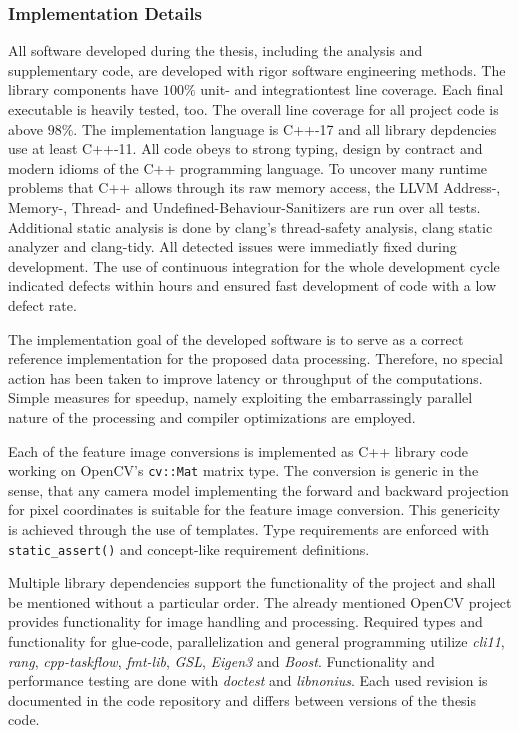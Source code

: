 \subsubsection{Implementation Details}

All software developed during the thesis, including the analysis and supplementary code, are developed with rigor software engineering methods.
The library components have $100\%$ unit- and integrationtest line coverage.
Each final executable is heavily tested, too.
The overall line coverage for all project code is above $98\%$.
The implementation language is C++-17\cite{c++17} and all library depdencies use at least C++-11\cite{c++11}.
All code obeys to strong typing, design by contract\cite{meyer_ieee1992} and modern idioms of the C++ programming language\cite{stroustrup_cpppl2013}.
To uncover many runtime problems that C++ allows through its raw memory access, the LLVM Address-, Memory-, Thread- and Undefined-Behaviour-Sanitizers\cite{google_sanitizers} are run over all tests.
Additional static analysis is done by clang's thread-safety analysis\cite{clang_thread_safety}, clang static analyzer\cite{clang_static_analyzer} and clang-tidy\cite{babati2017static}.
All detected issues were immediatly fixed during development.
The use of continuous integration\cite{fowler_ci2000} for the whole development cycle indicated defects within hours and ensured fast development of code with a low defect rate.

The implementation goal of the developed software is to serve as a correct reference implementation for the proposed data processing.
Therefore, no special action has been taken to improve latency or throughput of the computations.
Simple measures for speedup, namely exploiting the embarrassingly parallel nature of the processing and compiler optimizations are employed.

Each of the feature image conversions is implemented as C++ library code working on OpenCV's\cite{opencv_library} \lstinline[basicstyle=\ttfamily]|cv::Mat| matrix type.
The conversion is generic in the sense, that any camera model implementing the forward and backward projection for pixel coordinates is suitable for the feature image conversion.
This genericity is achieved through the use of templates.
Type requirements are enforced with \lstinline[basicstyle=\ttfamily]|static_assert()| and concept-like\cite{c++concepts} requirement definitions.

Multiple library dependencies support the functionality of the project and shall be mentioned without a particular order.
The already mentioned OpenCV\cite{opencv_library} project provides functionality for image handling and processing. 
Required types and functionality for glue-code, parallelization and general programming utilize \emph{cli11}\cite{cli11}, \emph{rang}\cite{rang}, \emph{cpp-taskflow}\cite{Huang2019CppTaskflowFT}, \emph{fmt-lib}\cite{fmtlib}, \emph{GSL}\cite{gsl}, \emph{Eigen3}\cite{eigenweb} and \emph{Boost}\cite{boost}.
Functionality and performance testing are done with \emph{doctest}\cite{doctest} and \emph{libnonius}\cite{libnonius}.
Each used revision is documented in the code repository and differs between versions of the thesis code.
